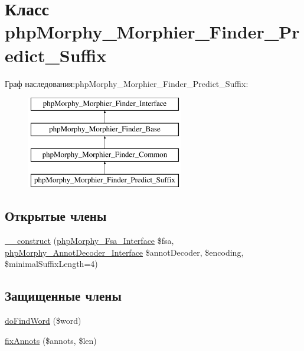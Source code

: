 \hypertarget{classphpMorphy__Morphier__Finder__Predict__Suffix}{
\section{Класс phpMorphy\_\-Morphier\_\-Finder\_\-Predict\_\-Suffix}
\label{classphpMorphy__Morphier__Finder__Predict__Suffix}
}
Граф наследования:phpMorphy\_\-Morphier\_\-Finder\_\-Predict\_\-Suffix:\begin{figure}[H]
\begin{center}
\leavevmode
\includegraphics[height=4.000000cm]{classphpMorphy__Morphier__Finder__Predict__Suffix}
\end{center}
\end{figure}
\subsection*{Открытые члены}
\begin{DoxyCompactItemize}
\item 
\hyperlink{classphpMorphy__Morphier__Finder__Predict__Suffix_aac66bed224341d133d7033e435143927}{\_\-\_\-construct} (\hyperlink{interfacephpMorphy__Fsa__Interface}{phpMorphy\_\-Fsa\_\-Interface} \$fsa, \hyperlink{interfacephpMorphy__AnnotDecoder__Interface}{phpMorphy\_\-AnnotDecoder\_\-Interface} \$annotDecoder, \$encoding, \$minimalSuffixLength=4)
\end{DoxyCompactItemize}
\subsection*{Защищенные члены}
\begin{DoxyCompactItemize}
\item 
\hyperlink{classphpMorphy__Morphier__Finder__Predict__Suffix_aab51b477a67508cc6fba424c788c6d14}{doFindWord} (\$word)
\item 
\hyperlink{classphpMorphy__Morphier__Finder__Predict__Suffix_a625e044c858ab5bfc996191ed0bc7817}{fixAnnots} (\$annots, \$len)
\end{DoxyCompactItemize}
